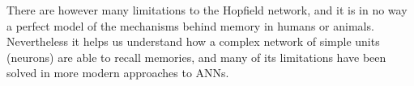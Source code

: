 There are however many limitations to the Hopfield network, and it is in no way a perfect model of the mechanisms behind memory in humans or animals. Nevertheless it helps us understand how a complex network of simple units (neurons) are able to recall memories, and many of its limitations have been solved in more modern approaches to ANNs.







